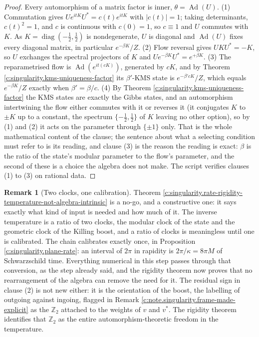 \documentclass[11pt]{article}
\theoremstyle{definition}
\newtheorem{remark}[theorem]{Remark}
\theoremstyle{plain}
\begin{document}
\begin{proof}
Every automorphism of a matrix factor is inner, $\theta = \operatorname{Ad}(U)$. (1) Commutation gives $Ue^{itK}U^{*} = c(t)e^{itK}$ with $|c(t)| = 1$; taking determinants, $c(t)^{2} = 1$, and $c$ is continuous with $c(0) = 1$, so $c \equiv 1$ and $U$ commutes with $K$. As $K = \operatorname{diag}(-\tfrac12, \tfrac12)$ is nondegenerate, $U$ is diagonal and $\operatorname{Ad}(U)$ fixes every diagonal matrix, in particular $e^{-\beta K}/Z$. (2) Flow reversal gives $UKU^{*} = -K$, so $U$ exchanges the spectral projectors of $K$ and $Ue^{-\beta K}U^{*} = e^{+\beta K}$. (3) The reparametrised flow is $\operatorname{Ad}(e^{it(cK)})$, generated by $cK$, and by Theorem \ref{c:singularity.kms-uniqueness-factor} its $\beta'$-KMS state is $e^{-\beta' cK}/Z$, which equals $e^{-\beta K}/Z$ exactly when $\beta' = \beta/c$. (4) By Theorem \ref{c:singularity.kms-uniqueness-factor} the KMS states are exactly the Gibbs states, and an automorphism intertwining the flow either commutes with it or reverses it (it conjugates $K$ to $\pm K$ up to a constant, the spectrum $\{-\tfrac12, \tfrac12\}$ of $K$ leaving no other option), so by (1) and (2) it acts on the parameter through $\{\pm 1\}$ only. That is the whole mathematical content of the clause; the sentence about what a selecting condition must refer to is its reading, and clause (3) is the reason the reading is exact: $\beta$ is the ratio of the state's modular parameter to the flow's parameter, and the second of these is a choice the algebra does not make. The script verifies clauses (1) to (3) on rational data.

\end{proof}

\begin{remark}[Two clocks, one calibration]\label{c:note.singularity.two-clocks-one-calibration}
Theorem \ref{c:singularity.rate-rigidity-temperature-not-algebra-intrinsic} is a no-go, and a constructive one: it says exactly what kind of input is needed and how much of it. The inverse temperature is a ratio of two clocks, the modular clock of the state and the geometric clock of the Killing boost, and a ratio of clocks is meaningless until one is calibrated. The chain calibrates exactly once, in Proposition \ref{c:singularity.plane-rate}: an interval of $2\pi$ in rapidity is $2\pi/\kappa = 8\pi M$ of Schwarzschild time. Everything numerical in this step passes through that conversion, as the step already said, and the rigidity theorem now proves that no rearrangement of the algebra can remove the need for it. The residual sign in clause (2) is not new either: it is the orientation of the boost, the labelling of outgoing against ingoing, flagged in Remark \ref{c:note.singularity.frame-made-explicit} as the $\mathbb{Z}_2$ attached to the weights of $v$ and $v^{*}$. The rigidity theorem identifies that $\mathbb{Z}_2$ as the entire automorphism-theoretic freedom in the temperature.
\end{remark}
\end{document}
